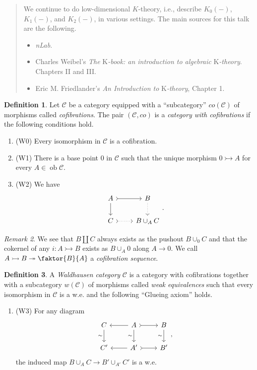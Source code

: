 \documentclass[10pt,letterpaper,cm]{nupset}
\theoremstyle{definition}
\newtheorem{definition}{Definition}
\theoremstyle{theorem}
\theoremstyle{remark}
\newtheorem{remark}[definition]{Remark}
\newcommand{\1}{\mathbf{1}}
\renewcommand{\c}{\mathscr{C}}
\newcommand{\0}{\vec 0}
\DeclareMathOperator{\ob}{ob}
\begin{document}
\begin{abstract}
We continue to do low-dimensional $K$-theory, i.e., describe $K_0(-)$, $K_1(-)$, and $K_2(-)$, in various settings. The main sources for this talk are the following.
\begin{itemize}
\item \textit{nLab}.
\item Charles Weibel's \textit{The} K\textit{-book: an introduction to algebraic} K\textit{-theory}. Chapters II and III.
\item Eric M. Friedlander's \textit{An Introduction to} K\textit{-theory}, Chapter 1.
\end{itemize}
\end{abstract}


\begin{definition}
Let $\c$ be a category equipped with a ``subcategory'' $co(\c)$ of morphisms called \textit{cofibrations}. The pair $(\c, co)$ is a \textit{category with cofibrations} if the following conditions hold.
\begin{enumerate}
\item (W0) Every isomorphism in $\c$ is a cofibration.
\item (W1) There is a base point $0$ in $\c$ such that the unique morphism $0 \rightarrowtail A$ for every $A \in \ob \c$.
\item (W2) We have
\[
\begin{tikzcd}
A \arrow[d] \arrow[r, tail] & B \arrow[d, dotted] \\
C \arrow[r, dotted, tail] & B \cup_A C
\end{tikzcd}.
\]
\end{enumerate}
\end{definition}

\begin{remark}
We see that $B \coprod C$ always exists as the pushout $B \cup_0 C$ and that the cokernel of any $i : A \rightarrowtail B$ exists as $B \cup_A 0$ along $A \to 0$. We call $A \rightarrowtail  B \twoheadrightarrow \faktor{B}{A}$ a \textit{cofibration sequence}.
\end{remark}

\begin{definition}
A \textit{Waldhausen category} $\c$ is a category with cofibrations together with a subcategory $w(\c)$ of morphisms called \textit{weak equivalences} such that every isomorphism in $\c$ is a w.e. and the following ``Glueing axiom'' holds.
\begin{enumerate}
\item (W3) For any diagram
\[
\begin{tikzcd}
C \arrow[d, "\sim"'] & A \arrow[d, "\sim"'] \arrow[r, tail] \arrow[l] & B \arrow[d, "\sim"'] \\
C' & A' \arrow[r, tail] \arrow[l] & B'
\end{tikzcd}, \]
the induced map $B \cup_A C \to  B' \cup_{A'} C'$ is a w.e.
\end{enumerate}
\end{definition}
\end{document}

